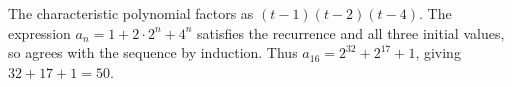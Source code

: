 The characteristic polynomial factors as $(t-1)(t-2)(t-4)$. The expression $a_n=1+2\cdot2^n+4^n$ satisfies the recurrence and all three initial values, so agrees with the sequence by induction. Thus $a_{16}=2^{32}+2^{17}+1$, giving $\boxed{32+17+1=50}$.
